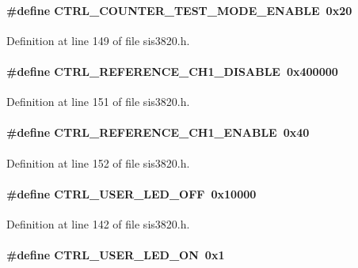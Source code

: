 \paragraph[{CTRL\_\-COUNTER\_\-TEST\_\-MODE\_\-ENABLE}]{\setlength{\rightskip}{0pt plus 5cm}\#define CTRL\_\-COUNTER\_\-TEST\_\-MODE\_\-ENABLE~0x20}\hfill\label{sis3820_8h_ac1b58f3ad7bf17e030f539626f2ae02e}


Definition at line 149 of file sis3820.h.
\paragraph[{CTRL\_\-REFERENCE\_\-CH1\_\-DISABLE}]{\setlength{\rightskip}{0pt plus 5cm}\#define CTRL\_\-REFERENCE\_\-CH1\_\-DISABLE~0x400000}\hfill\label{sis3820_8h_a18efb8b6f7d74d5af509eaccc675775d}


Definition at line 151 of file sis3820.h.
\paragraph[{CTRL\_\-REFERENCE\_\-CH1\_\-ENABLE}]{\setlength{\rightskip}{0pt plus 5cm}\#define CTRL\_\-REFERENCE\_\-CH1\_\-ENABLE~0x40}\hfill\label{sis3820_8h_aa5a292a26cfee6361a456c03a881e204}


Definition at line 152 of file sis3820.h.
\paragraph[{CTRL\_\-USER\_\-LED\_\-OFF}]{\setlength{\rightskip}{0pt plus 5cm}\#define CTRL\_\-USER\_\-LED\_\-OFF~0x10000}\hfill\label{sis3820_8h_a57c3b2d3e0797e6dacb3985e6adf8cee}


Definition at line 142 of file sis3820.h.
\paragraph[{CTRL\_\-USER\_\-LED\_\-ON}]{\setlength{\rightskip}{0pt plus 5cm}\#define CTRL\_\-USER\_\-LED\_\-ON~0x1}\hfill\label{sis3820_8h_a021d3ce044e2f673869c147b314c0ddb}


